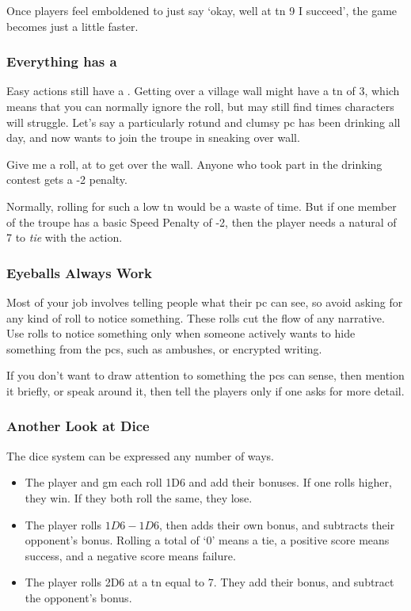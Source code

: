 \begin{multicols}{2}
Once players feel emboldened to just say `okay, well at \gls{tn} 9 I succeed', the game becomes just a little faster.

\subsubsection{Everything has a }

Easy actions still have a . 
Getting over a \gls{village} wall might have a \gls{tn} of 3, which means that you can normally ignore the roll, but may still find times characters will struggle.
Let's say a particularly rotund and clumsy \gls{pc} has been drinking all day, and now wants to join the troupe in sneaking over  wall.

\begin{speechtext}
  Give me a  roll, at \tn[3] to get over the wall.
  Anyone who took part in the drinking contest gets a -2 penalty.
\end{speechtext}

Normally, rolling for such a low \gls{tn} would be a waste of time.
But if one member of the troupe has a basic Speed Penalty of -2, then the player needs a \gls{natural} of 7 to \emph{tie} with the action.

\subsubsection{Eyeballs Always Work}

Most of your job involves telling people what their \gls{pc} can see, so avoid asking for any kind of roll to notice something.
These rolls cut the flow of any narrative.
Use rolls to notice something only when someone actively wants to hide something from the \glspl{pc}, such as ambushes, or encrypted writing.

If you don't want to draw attention to something the \glspl{pc} can sense, then mention it briefly, or speak around it, then tell the players only if one asks for more detail.

\subsubsection{Another Look at Dice}

The dice system can be expressed any number of ways.

\begin{itemize}

  \item
  The player and \gls{gm} each roll 1D6 and add their bonuses.
  If one rolls higher, they win.
  If they both roll the same, they lose.
  \item
  The player rolls $1D6-1D6$, then adds their own bonus, and subtracts their opponent's bonus.
  Rolling a total of `0' means a tie, a positive score means success, and a negative score means failure.
  \item
  The player rolls 2D6 at a \gls{tn} equal to 7.
  They add their bonus, and subtract the opponent's bonus.


\end{itemize}
\end{multicols}
